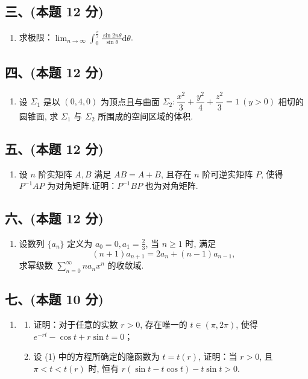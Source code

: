 \subsection*{三、(本题 12 分)}
\begin{enumerate}
    \item 求极限：$\displaystyle\lim_{n \to \infty} \int_{0}^{\frac{\pi}{2}} \frac{\sin 2n\theta}{\sin \theta} \mathrm{d}\theta$.
\end{enumerate}

\subsection*{四、(本题 12 分)}
\begin{enumerate}
    \item 设 $\Sigma_1$ 是以 $(0, 4, 0)$ 为顶点且与曲面 $\Sigma_2: \dfrac{x^2}{3} + \dfrac{y^2}{4} + \dfrac{z^2}{3} = 1 \ (y > 0)$ 相切的圆锥面, 求 $\Sigma_1$ 与 $\Sigma_2$ 所围成的空间区域的体积.
\end{enumerate}

\subsection*{五、(本题 12 分)}
\begin{enumerate}
    \item 设 $n$ 阶实矩阵 $A, B$ 满足 $AB = A + B$, 且存在 $n$ 阶可逆实矩阵 $P$, 使得 $P^{-1}AP$ 为对角矩阵.证明：$P^{-1}BP$ 也为对角矩阵.
\end{enumerate}

\subsection*{六、(本题 12 分)}
\begin{enumerate}
    \item 设数列 $\{a_n\}$ 定义为 $a_0 = 0, a_1 = \frac{2}{3}$, 当 $n \geqslant 1$ 时, 满足
          \[
              (n + 1)a_{n+1} = 2a_n + (n - 1)a_{n-1},
          \]
          求幂级数 $\displaystyle\sum_{n=0}^{\infty} n a_n x^n$ 的收敛域.
\end{enumerate}

\subsection*{七、(本题 10 分)}
\begin{enumerate}
    \item
          \begin{enumerate}
              \item[(1)] 证明：对于任意的实数 $r > 0$, 存在唯一的 $t \in (\pi, 2\pi)$, 使得 $e^{-rt} - \cos t + r \sin t = 0$；
              \item[(2)] 设 (1) 中的方程所确定的隐函数为 $t = t(r)$, 证明：当 $r > 0$, 且 $\pi < t < t(r)$ 时, 恒有 $r(\sin t - t \cos t) - t \sin t > 0$.
          \end{enumerate}
\end{enumerate}


